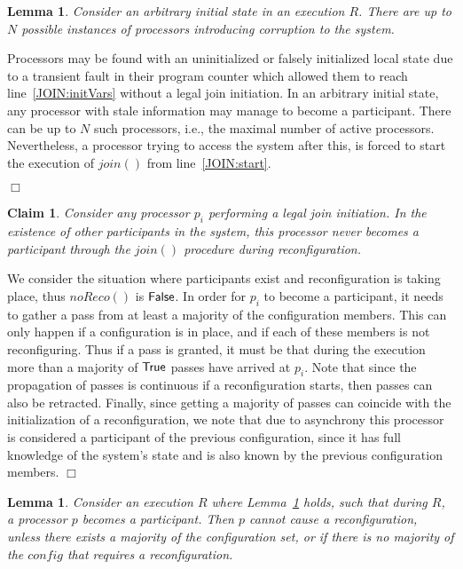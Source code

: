 \documentclass[11pt]{article}
\newcommand{\noReconfig}{noReco}
\newtheorem{lemma}[theorem]{Lemma}
\newtheorem{claim}[theorem]{Claim}
\newenvironment{proof}{\noindent{\bf Proof.}}{\hfill$\Box$}
\begin{document}
\begin{lemma}
\label{thJ:boundedCorruptJoins}
Consider an arbitrary initial state in an execution $R$. 
There are up to $N$ possible instances of processors introducing corruption to the system.
\end{lemma}

\begin{proof}
Processors may be found with an uninitialized or falsely initialized local state due to a transient fault in their program counter which allowed them to reach line~\ref{JOIN:initVars} without a legal join initiation.
In an arbitrary initial state, any processor with stale information may manage to become a participant.
There can be up to $N$ such processors, i.e., the maximal number of active processors.
Nevertheless, a processor trying to access the system after this, is forced to start the execution of $join()$ from line~\ref{JOIN:start}.


\end{proof}


\begin{claim}
\label{thJ:noReconfJoin}
Consider any processor $p_i$ performing a legal join initiation. 
In the existence of other participants in the system, this processor never becomes a participant through the $join()$ procedure during reconfiguration.
\end{claim}

\begin{proof}
We consider the situation where participants exist and reconfiguration is taking place, thus $\noReconfig()$ is $\sf False$.
In order for $p_i$ to become a participant, it needs to gather a pass from at least a majority of the configuration members.
This can only happen if a configuration is in place, and if each of these members is not reconfiguring.
Thus if a pass is granted, it must be that during the execution more than a majority of $\sf True$ passes have arrived at $p_i$.
Note that since the propagation of passes is continuous if a reconfiguration starts, then passes can also be retracted.
Finally, since getting a majority of passes can coincide with the initialization of a reconfiguration, we note that due to asynchrony this processor is considered a participant of the previous configuration, since it has full knowledge of the system's state and is also known by the previous configuration members.
\end{proof}



\begin{lemma}
\label{thQ:noReconfByJoiner}
Consider an execution $R$ where Lemma~\ref{thJ:noReconfJoin} holds, such that during $R$, a processor $p$ becomes a participant. 
Then $p$ cannot cause a reconfiguration, unless there exists a majority of the configuration set, or if there is no majority of the $config$ that requires a reconfiguration.
\end{lemma}
\end{document}
